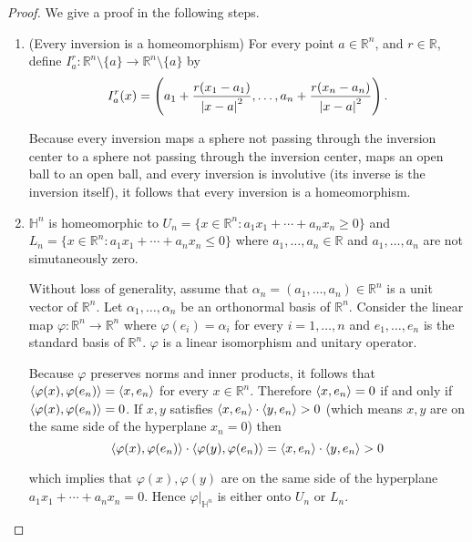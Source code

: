 \begin{proof}
	We give a proof in the following steps.
	\begin{enumerate}[label={\textbf{Step \arabic*.}},itemindent=1cm]
		\item (Every inversion is a homeomorphism) For every point $a\in\mathbb{R}^{n}$, and $r\in\mathbb{R}$, define $I^{r}_{a}: \mathbb{R}^{n}\setminus\{ a \} \to \mathbb{R}^{n}\setminus\{ a \}$ by
		      \[
			      I^{r}_{a}(x) = \left(a_{1} + \frac{r(x_{1} - a_{1})}{\left\vert{x - a}\right\vert^{2}}, \ldots, a_{n} + \frac{r(x_{n} - a_{n})}{\left\vert{x-a}\right\vert^{2}}\right).
		      \]

		      Because every inversion maps a sphere not passing through the inversion center to a sphere not passing through the inversion center, maps an open ball to an open ball, and every inversion is involutive (its inverse is the inversion itself), it follows that every inversion is a homeomorphism.
		\item $\mathbb{H}^{n}$ is homeomorphic to $U_{n} = \{ x\in\mathbb{R}^{n} : a_{1}x_{1} + \cdots + a_{n}x_{n} \geq 0 \}$ and $L_{n} = \{ x\in\mathbb{R}^{n} : a_{1}x_{1} + \cdots + a_{n}x_{n} \leq 0 \}$ where $a_{1}, \ldots, a_{n}\in\mathbb{R}$ and $a_{1}, \ldots, a_{n}$ are not simutaneously zero.

		      Without loss of generality, assume that $\alpha_{n} = (a_{1}, \ldots, a_{n})\in\mathbb{R}^{n}$ is a unit vector of $\mathbb{R}^{n}$. Let $\alpha_{1}, \ldots, \alpha_{n}$ be an orthonormal basis of $\mathbb{R}^{n}$. Consider the linear map $\varphi: \mathbb{R}^{n}\to \mathbb{R}^{n}$ where $\varphi(e_{i}) = \alpha_{i}$ for every $i = 1,\ldots, n$ and $e_{1}, \ldots, e_{n}$ is the standard basis of $\mathbb{R}^{n}$. $\varphi$ is a linear isomorphism and unitary operator.

		      Because $\varphi$ preserves norms and inner products, it follows that $\left\langle{\varphi(x), \varphi(e_{n})}\right\rangle = \left\langle{x, e_{n}}\right\rangle$ for every $x\in\mathbb{R}^{n}$. Therefore $\left\langle{x, e_{n}}\right\rangle = 0$ if and only if $\left\langle{\varphi(x), \varphi(e_{n})}\right\rangle = 0$. If $x, y$ satisfies $\left\langle{x, e_{n}}\right\rangle \cdot \left\langle{y, e_{n}}\right\rangle > 0$ (which means $x, y$ are on the same side of the hyperplane $x_{n} = 0$) then
		      \[
			      \left\langle{\varphi(x), \varphi(e_{n})}\right\rangle\cdot\left\langle{\varphi(y), \varphi(e_{n})}\right\rangle = \left\langle{x, e_{n}}\right\rangle\cdot\left\langle{y, e_{n}}\right\rangle > 0
		      \]

		      which implies that $\varphi(x), \varphi(y)$ are on the same side of the hyperplane $a_{1}x_{1} + \cdots + a_{n}x_{n} = 0$. Hence $\varphi\vert_{\mathbb{H}^{n}}$ is either onto $U_{n}$ or $L_{n}$.


\end{enumerate}
\end{proof}
